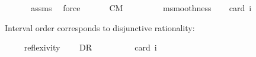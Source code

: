 \begin{isabellebody}
\ \ %
\isanewline
%
\isadelimproof
\ \ %
\endisadelimproof
%
\isatagproof
{}\isamarkupfalse%
\ assms\ \isamarkupfalse%
\ force%
\endisatagproof
{\isafoldproof}%
%
\isadelimproof
\ \isanewline
%
\endisadelimproof
\isanewline
{}\isamarkupfalse%
\ \isanewline
\ \ \ CM{\isacharcolon}{\kern0pt}\ {\isachardoublequoteopen}{\isasymlfloor}{\isacharparenleft}{\kern0pt}{\isasymcircle}{\isacharless}{\kern0pt}{\isasympsi}{\isacharbar}{\kern0pt}{\isasymphi}{\isachargreater}{\kern0pt}\ \isactrlbold {\isasymand}\ {\isasymcircle}{\isacharless}{\kern0pt}{\isasymchi}{\isacharbar}{\kern0pt}{\isasymphi}{\isachargreater}{\kern0pt}{\isacharparenright}{\kern0pt}\ \isactrlbold {\isasymrightarrow}\ {\isasymcircle}{\isacharless}{\kern0pt}{\isasymchi}{\isacharbar}{\kern0pt}{\isasymphi}\isactrlbold {\isasymand}{\isasympsi}{\isachargreater}{\kern0pt}{\isasymrfloor}{\isachardoublequoteclose}\isanewline
\ \ \ \ msmoothness\isanewline
\ \ \isamarkupfalse%
\ {\isacharbrackleft}{\kern0pt}card\ i{\isacharequal}{\kern0pt}{}{\isacharbrackright}{\kern0pt}\ \ %
\isanewline
%
\isadelimproof
\ \ %
\endisadelimproof
%
\isatagproof
{}\isamarkupfalse%
%
\endisatagproof
{\isafoldproof}%
%
\isadelimproof
%
\endisadelimproof
%
\begin{isamarkuptext}%
Interval order corresponds to disjunctive rationality:%
\end{isamarkuptext}\isamarkuptrue%
\isamarkupfalse%
\ \isanewline
\ \ \ reflexivity\isanewline
\ \ \ \ DR{\isacharcolon}{\kern0pt}\ {\isachardoublequoteopen}{\isasymlfloor}{\isasymcircle}{\isacharless}{\kern0pt}{\isasymchi}{\isacharbar}{\kern0pt}{\isasymphi}\isactrlbold {\isasymor}{\isasympsi}{\isachargreater}{\kern0pt}\ \isactrlbold {\isasymrightarrow}\ {\isacharparenleft}{\kern0pt}{\isasymcircle}{\isacharless}{\kern0pt}{\isasymchi}{\isacharbar}{\kern0pt}{\isasymphi}{\isachargreater}{\kern0pt}\ \isactrlbold {\isasymor}\ {\isasymcircle}{\isacharless}{\kern0pt}{\isasymchi}{\isacharbar}{\kern0pt}{\isasympsi}{\isachargreater}{\kern0pt}{\isacharparenright}{\kern0pt}{\isasymrfloor}{\isachardoublequoteclose}\ \isanewline
\ \ \isamarkupfalse%
\ {\isacharbrackleft}{\kern0pt}card\ i{\isacharequal}{\kern0pt}{}{\isacharbrackright}{\kern0pt}\ \ %
\isanewline
%
\isadelimproof
\ \ %
\endisadelimproof
%
\isatagproof
{}\isamarkupfalse%

\end{isabellebody}
